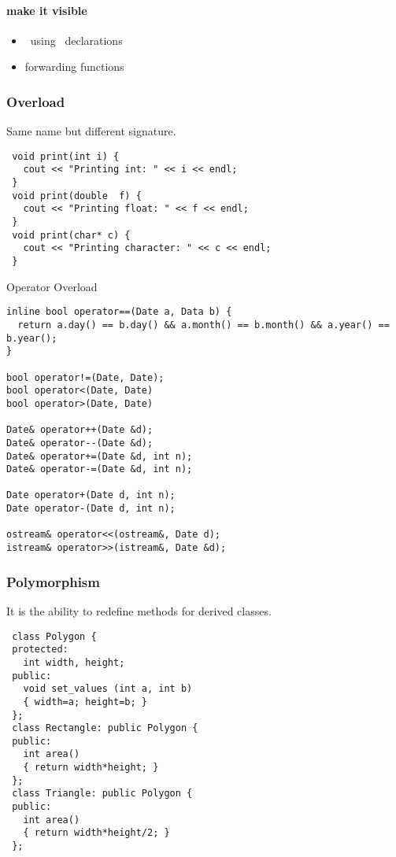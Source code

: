 \paragraph{make it visible}
\begin{itemize}
\item ~using~ declarations
\item forwarding functions
\end{itemize}

\subsubsection{Overload}
Same name but different signature.
\begin{lstlisting}
 void print(int i) {
   cout << "Printing int: " << i << endl;
 }
 void print(double  f) {
   cout << "Printing float: " << f << endl;
 }
 void print(char* c) {
   cout << "Printing character: " << c << endl;
 }
\end{lstlisting}

Operator Overload

\begin{lstlisting}
inline bool operator==(Date a, Data b) {
  return a.day() == b.day() && a.month() == b.month() && a.year() == b.year();
}

bool operator!=(Date, Date);
bool operator<(Date, Date)
bool operator>(Date, Date)

Date& operator++(Date &d);
Date& operator--(Date &d);
Date& operator+=(Date &d, int n);
Date& operator-=(Date &d, int n);

Date operator+(Date d, int n);
Date operator-(Date d, int n);

ostream& operator<<(ostream&, Date d);
istream& operator>>(istream&, Date &d);
\end{lstlisting}

\subsubsection{Polymorphism}
It is the ability to redefine methods for derived classes.

\begin{lstlisting}
 class Polygon {
 protected:
   int width, height;
 public:
   void set_values (int a, int b)
   { width=a; height=b; }
 };
 class Rectangle: public Polygon {
 public:
   int area()
   { return width*height; }
 };
 class Triangle: public Polygon {
 public:
   int area()
   { return width*height/2; }
 };
\end{lstlisting}

